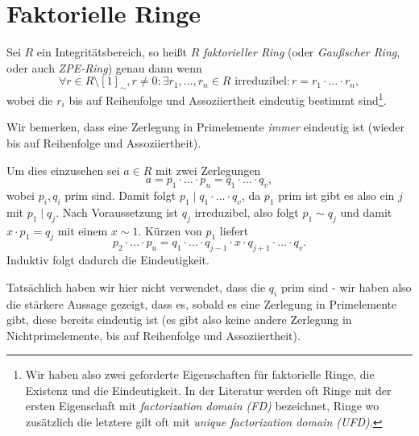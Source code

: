 
\section{Faktorielle Ringe}

\begin{definition}
    Sei $R$ ein Integritätsbereich, so heißt $R$ \emph{faktorieller Ring} (oder \emph{Gaußscher Ring}, oder auch \emph{ZPE-Ring}) genau dann wenn
    $$ \forall r \in R\setminus [1]_\sim, r\neq 0: \exists r_1, \hdots, r_n \in R\text{ irreduzibel} : r = r_1 \cdot \hdots \cdot r_n, $$
    wobei die $r_i$ bis auf Reihenfolge und Assoziiertheit eindeutig bestimmt sind\footnote{Wir haben also zwei geforderte Eigenschaften für faktorielle Ringe, die Existenz und die Eindeutigkeit. In der Literatur werden oft Ringe mit der ersten Eigenschaft mit \emph{factorization domain (FD)} bezeichnet, Ringe wo zusätzlich die letztere gilt oft mit \emph{unique factorization domain (UFD)}.}.
\end{definition}

\begin{remark}
    Wir bemerken, dass eine Zerlegung in Primelemente \emph{immer} eindeutig ist (wieder bis auf Reihenfolge und Assoziiertheit).

    Um dies einzusehen sei $a \in R$ mit zwei Zerlegungen
    $$ a = p_1 \cdot \hdots \cdot p_u = q_1 \cdot \hdots \cdot q_v, $$
    wobei $p_i, q_i$ prim sind. Damit folgt $p_1 \mid q_1 \cdot \hdots \cdot q_v$, da $p_1$ prim ist gibt es also ein $j$ mit $p_1 \mid q_j$. Nach Voraussetzung ist $q_j$ irreduzibel, also folgt $p_1 \sim q_j$ und damit $x \cdot p_1 = q_j$ mit einem $x \sim 1$. Kürzen von $p_1$ liefert
    $$ p_2 \cdot \hdots \cdot p_u = q_1 \cdot \hdots \cdot q_{j-1} \cdot x \cdot q_{j+1} \cdot \hdots \cdot q_v. $$
    Induktiv folgt dadurch die Eindeutigkeit.

    Tatsächlich haben wir hier nicht verwendet, dass die $q_i$ prim sind - wir haben also die stärkere Aussage gezeigt, dass es, sobald es eine Zerlegung in Primelemente gibt, diese bereits eindeutig ist (es gibt also keine andere Zerlegung in Nichtprimelemente, bis auf Reihenfolge und Assoziiertheit).
\end{remark}

